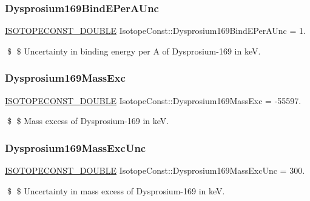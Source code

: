 \subsubsection{\texorpdfstring{Dysprosium169\+Bind\+E\+Per\+A\+Unc}{Dysprosium169BindEPerAUnc}}
{\footnotesize\ttfamily \mbox{\hyperlink{group___isotope_const-_macros_ga8f45a7272ce02c0b4c65c44636ed719a}{I\+S\+O\+T\+O\+P\+E\+C\+O\+N\+S\+T\+\_\+\+D\+O\+U\+B\+LE}} Isotope\+Const\+::\+Dysprosium169\+Bind\+E\+Per\+A\+Unc = 1.}

\$ \$ Uncertainty in binding energy per A of Dysprosium-\/169 in keV. \mbox{\label{group___isotope_const-_dysprosium-_dy169_ga4cdfec54547b7e6d3a04ac37904ce501}} 
\subsubsection{\texorpdfstring{Dysprosium169\+Mass\+Exc}{Dysprosium169MassExc}}
{\footnotesize\ttfamily \mbox{\hyperlink{group___isotope_const-_macros_ga8f45a7272ce02c0b4c65c44636ed719a}{I\+S\+O\+T\+O\+P\+E\+C\+O\+N\+S\+T\+\_\+\+D\+O\+U\+B\+LE}} Isotope\+Const\+::\+Dysprosium169\+Mass\+Exc = -\/55597.}

\$ \$ Mass excess of Dysprosium-\/169 in keV. \mbox{\label{group___isotope_const-_dysprosium-_dy169_ga2354b275ed83708cb0cc57441b241ae7}} 
\subsubsection{\texorpdfstring{Dysprosium169\+Mass\+Exc\+Unc}{Dysprosium169MassExcUnc}}
{\footnotesize\ttfamily \mbox{\hyperlink{group___isotope_const-_macros_ga8f45a7272ce02c0b4c65c44636ed719a}{I\+S\+O\+T\+O\+P\+E\+C\+O\+N\+S\+T\+\_\+\+D\+O\+U\+B\+LE}} Isotope\+Const\+::\+Dysprosium169\+Mass\+Exc\+Unc = 300.}

\$ \$ Uncertainty in mass excess of Dysprosium-\/169 in keV. \mbox{\label{group___isotope_const-_dysprosium-_dy169_gafff8ed7eaf37068c6326b2730446b3ab}} 
